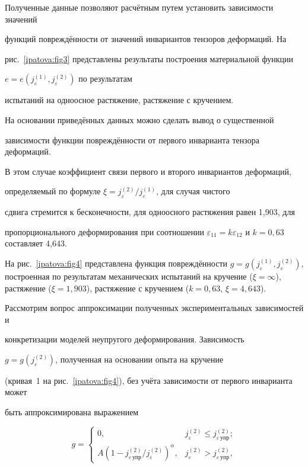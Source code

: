 Полученные данные позволяют расчётным путем установить зависимости значений

функций повреждённости от значений инвариантов тензоров  деформаций. На

рис.~\ref{ipatova:fig3} представлены результаты построения материальной функции

$e=e(j_\varepsilon^{(1)},j_\varepsilon^{(2)} )$ по результатам

испытаний на одноосное растяжение, растяжение с кручением.



На основании приведённых данных можно сделать вывод о существенной

зависимости функции повреждённости от первого инварианта тензора деформаций.



В этом случае коэффициент связи первого и второго инвариантов деформаций,

определяемый по формуле $\xi =j_\varepsilon^{(2)} / j_\varepsilon^{(1)}$, для случая чистого

сдвига стремится к бесконечности, для одноосного растяжения равен 1,903, для

пропорционального деформирования при соотношении $\varepsilon _{11}

=k\varepsilon _{12}$ и $k=0,63$  составляет 4,643.





На рис.~\ref{ipatova:fig4} представлена функция повреждённости $g=g(j_\varepsilon^{(1)}

,j_\varepsilon ^{(2)} )$, построенная по результатам механических испытаний на кручение ($\xi =\infty $), растяжение ($\xi =1,903$), растяжение с кручением ($k=0,63$, $\xi =4,643$).



Рассмотрим вопрос аппроксимации полученных экспериментальных зависимостей и

конкретизации моделей не\-уп\-ру\-го\-го деформирования. Зависимость

$g=g(j_\varepsilon ^{(2)} )$, полученная на основании опыта на кручение

(кривая~1 на рис.~\ref{ipatova:fig4}), без учёта зависимости от первого инварианта может

быть аппроксимирована выражением

\begin{equation}

\label{ipatova:eq6}

g=\begin{cases}

 0,& j_\varepsilon^{(2)} \le j_{\varepsilon\, \text{упр}}^{(2)}; \\

 A (1-{j_{\varepsilon \,\text{упр}}^{(2)}}/{j_\varepsilon^{(2)} })^\alpha, &

 j_\varepsilon^{(2)} >j_{\varepsilon\, \text{упр}}^{(2)},

  \end{cases}

\end{equation}

